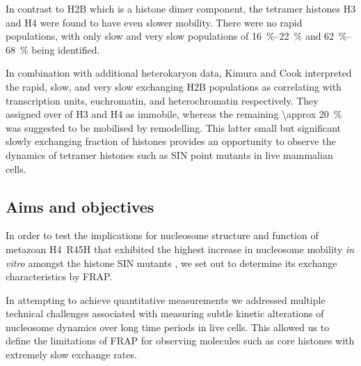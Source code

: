     In contrast to H2B which is a histone dimer component, the tetramer
    histones H3 and H4 were found to have even slower mobility.  There
    were no rapid populations, with only slow and very slow populations
    of \SIrange{16}{22}{\percent} and \SIrange{62}{68}{\percent} being
    identified.

    In combination with additional heterokaryon data, Kimura and Cook
    interpreted the rapid, slow, and very slow exchanging H2B
    populations as correlating with transcription units, euchromatin,
    and heterochromatin respectively.  They assigned over 
    of H3 and H4 as immobile, whereas the remaining
    \SI{\approx 20}{\percent} was suggested to be mobilised by
    remodelling.  This latter small but significant
    slowly exchanging fraction of histones
    provides an opportunity to observe the dynamics of
    tetramer histones such as SIN point mutants in live mammalian cells.


  \subsection{Aims and objectives}

    In order to test the implications for nucleosome structure and function
    of metazoan H4~R45H that exhibited the highest increase
    in nucleosome mobility \textit{in vitro} amongst
    the histone SIN mutants \citep{flaus2004sin},
    we set out to determine its exchange characteristics by FRAP.

    In attempting to achieve quantitative measurements
    we addressed multiple technical challenges associated with
    measuring subtle kinetic alterations of nucleosome dynamics
    over long time periods in live cells.
    This allowed us to define the limitations of FRAP for observing molecules
    such as core histones with extremely slow exchange rates.

